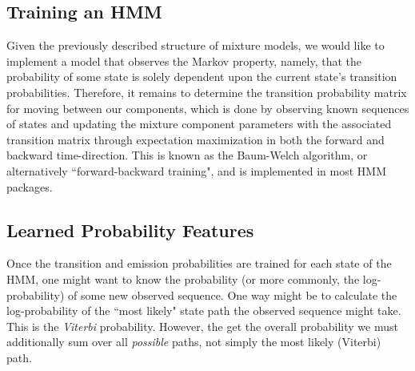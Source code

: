 \documentclass[twocolumn,10pt]{article}
\begin{document}


\subsection{Training an HMM}

Given the previously described structure of mixture models, we would like to implement a model that observes the Markov property, namely, that the probability of some state is solely dependent upon the current state's transition probabilities. Therefore, it remains to determine the transition probability matrix for moving between our components, which is done by observing known sequences of states and updating the mixture component parameters with the associated transition matrix through expectation maximization in both the forward and backward time-direction. This is known as the Baum-Welch algorithm, or alternatively ``forward-backward training", and is implemented in most HMM packages.~\citep{baum-welch}



\subsection{Learned Probability Features}
Once the transition and emission probabilities are trained for each state of the HMM, one might want to know the probability (or more commonly, the log-probability) of some new observed sequence. One way might be to calculate the log-probability of the ``most likely" state path the observed sequence might take. This is the \textit{Viterbi} probability. However, the get the overall probability we must additionally sum over all \textit{possible} paths, not simply the most likely (Viterbi) path. 
\end{document}
